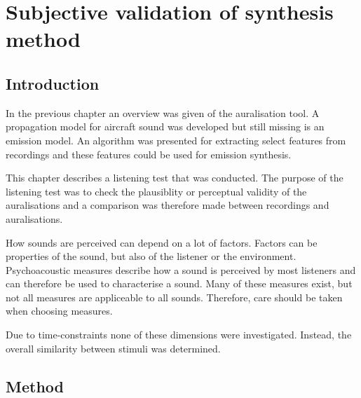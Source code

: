 \chapter{Subjective validation of synthesis method}\label{chapter:test}

\section{Introduction}
In the previous chapter an overview was given of the auralisation tool. A
propagation model for aircraft sound was developed but still missing is an
emission model. An algorithm was presented for extracting select features from
recordings and these features could be used for emission synthesis.

This chapter describes a listening test that was conducted. The purpose of the
listening test was to check the plausiblity or perceptual validity of the
auralisations and a comparison was therefore made between recordings and
auralisations.

How sounds are perceived can depend on a lot of factors. Factors can be
properties of the sound, but also of the listener or the environment.
Psychoacoustic measures describe how a sound is perceived by most listeners and
can therefore be used to characterise a sound. Many of these measures exist, but
not all measures are appliceable to all sounds. Therefore, care should be taken
when choosing measures.

Due to time-constraints none of these dimensions were investigated. Instead, the
overall similarity between stimuli was determined.

%


\section{Method}

